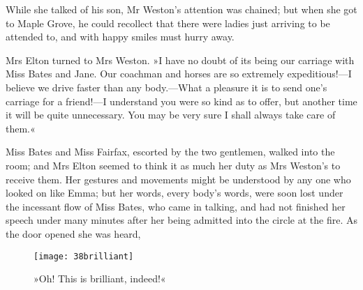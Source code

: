 While she talked of his son, Mr Weston's attention was chained; but when she got to Maple Grove, he could recollect that there were ladies just arriving to be attended to, and with happy smiles must hurry away.

Mrs Elton turned to Mrs Weston. »I have no doubt of its being our carriage with Miss Bates and Jane. Our coachman and horses are so extremely expeditious!—I believe we drive faster than any body.—What a pleasure it is to send one's carriage for a friend!—I understand you were so kind as to offer, but another time it will be quite unnecessary. You may be very sure I shall always take care of them.«

Miss Bates and Miss Fairfax, escorted by the two gentlemen, walked into the room; and Mrs Elton seemed to think it as much her duty as Mrs Weston's to receive them. Her gestures and movements might be understood by any one who looked on like Emma; but her words, every body's words, were soon lost under the incessant flow of Miss Bates, who came in talking, and had not finished her speech under many minutes after her being admitted into the circle at the fire. As the door opened she was heard,

\begin{figure}[tbph]
\centering
\texttt{[image: 38brilliant]}
\caption{»Oh! This is brilliant, indeed!«}
\end{figure}

